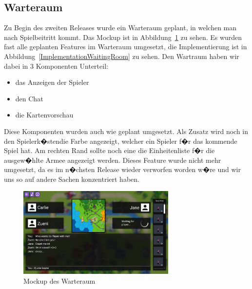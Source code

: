 \documentclass[12pt, titlepage]{scrartcl}
\newcommand{\Abb}[1]{%
	Abbildung\ \ref{#1}%
}
\begin{document}
			\subsection{Warteraum}
			Zu Begin des zweiten Releases wurde ein Warteraum geplant, in welchen man nach Spielbeitritt kommt. Das Mockup ist in \Abb{MockupWaitingRoom} zu sehen. Es wurden fast alle geplanten Features im Warteraum umgesetzt, die Implementierung ist in \Abb{ImplementationWaitingRoom} zu sehen. Den Wartraum haben wir dabei in 3 Komponenten Unterteil:
			\begin{itemize}
				\item das Anzeigen der Spieler
				\item den Chat
				\item die Kartenvorschau
			\end{itemize}
			Diese Komponenten wurden auch wie geplant umgesetzt. Als Zusatz wird noch in den \glqq Spielerk�sten\grqq die Farbe angezeigt, welcher ein Spieler f�r das kommende Spiel hat. Am rechten Rand sollte noch eine die Einheitenliste f�r die ausgew�hlte Armee angezeigt werden. Dieses Feature wurde nicht mehr umgesetzt, da es im n�chsten Release wieder verworfen worden w�re und wir uns so auf andere Sachen konzentriert haben.
			\begin{figure}[H] 
				\centering
				\includegraphics[width=0.7\textwidth]{Waiting_Room_Game_mit_ArmyView.png}
				\caption{Mockup des Warteraum}
				\label{MockupWaitingRoom}
			\end{figure}
			
\end{document}
